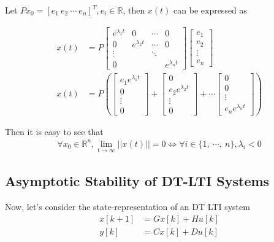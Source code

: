 \documentclass[twoside]{article}
\begin{document}
Let $P x_0 = [e_1 \ e_2 \ \cdots \ e_n ]^T, e_i \in \mathbb{R}$, then 
$x(t)$ can be expressed as

\begin{align*}
x(t) &= P \left[ \begin{array}{cccc} e^{\lambda_1 t} & 0 & \cdots & 0 
\\
0 & e^{\lambda_2 t} &  \cdots & 0 
\\
\vdots &  &  \ddots &  
\\
0 &  &  &  e^{\lambda_n t}
\end{array} \right] 
\left[ \begin{array}{c} e_1 \\ e_2 \\ \vdots \\ e_n \end{array}
  \right] 
\\
x(t) &= P \left(
\left[ \begin{array}{c} e_1 e^{\lambda_1 t} \\ 0 \\ \vdots \\
         0 \end{array} \right]
+
\left[ \begin{array}{c} 0 \\ e_2 e^{\lambda_2 t} \\ \vdots \\
         0 \end{array} \right]
+ \cdots
\left[ \begin{array}{c} 0 \\ 0 \\ \vdots \\
         e_n e^{\lambda_n t}  \end{array} \right]
\right)
\end{align*}

Then it is easy to see that
\begin{align*}
    \forall x_0 \in \mathbb{R}^n, \lim_{t \to \infty} || x(t) || = 0
    \iff \forall i \in \lbrace 1 , \ \cdots ,  \ n \rbrace, \lambda_i < 0
\end{align*}

\subsection*{Asymptotic Stability of DT-LTI Systems}

Now, let's consider the state-representation of an DT LTI system 
%
\begin{align*}
  x[k+1] &= G x[k] + H u[k]
\\
  y[k] &= C x[k] + D u[k]
\end{align*}
%
\end{document}
